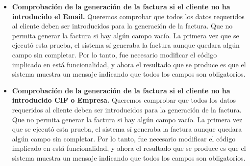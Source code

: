 \begin{itemize}
\begin{itemize}
	\item \textbf{Comprobación de la generación de la factura si el cliente no ha introducido el Email.} Queremos comprobar que todos los datos requeridos al cliente deben ser introducidos para la generación de la factura. Que no permita generar la factura si hay algún campo vacío. La primera vez que se ejecutó esta prueba, el sistema sí generaba la factura aunque quedara algún campo sin completar. Por lo tanto, fue necesario modificar el código implicado en está funcionalidad, y ahora el resultado que se produce es que el sistema muestra un mensaje indicando que todos los campos son obligatorios.
	\item \textbf{Comprobación de la generación de la factura si el cliente no ha introducido CIF o Empresa.} Queremos comprobar que todos los datos requeridos al cliente deben ser introducidos para la generación de la factura. Que no permita generar la factura si hay algún campo vacío. La primera vez que se ejecutó esta prueba, el sistema sí generaba la factura aunque quedara algún campo sin completar. Por lo tanto, fue necesario modificar el código implicado en está funcionalidad, y ahora el resultado que se produce es que el sistema muestra un mensaje indicando que todos los campos son obligatorios.
	\end{itemize}		
	

\end{itemize}

